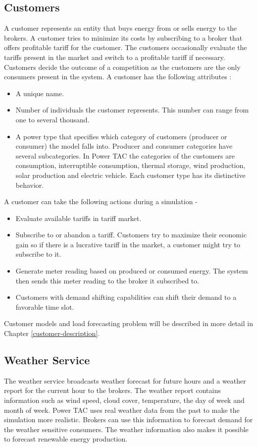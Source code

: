 \subsection{Customers}
A customer represents an entity that buys energy from or sells energy to the brokers. A customer tries to minimize its costs by subscribing to a broker that offers profitable tariff for the customer. The customers occasionally evaluate the tariffs present in the market and switch to a profitable tariff if necessary. Customers decide the outcome of a competition as the customers are the only consumers present in the system. A customer has the following attributes :
\begin{itemize}  
\item A unique name. 
\item Number of individuals the customer represents. This number can range from one to several thousand. 
\item A power type that specifies which category of customers (producer or consumer) the model falls into. Producer and consumer categories have several subcategories. In Power TAC the categories of the customers are consumption, interruptible consumption, thermal storage, wind production, solar production and electric vehicle. Each customer type has its distinctive behavior. 
\end{itemize}

A customer can take the following actions during a simulation - 
\begin{itemize}  
\item Evaluate available tariffs in tariff market.
\item Subscribe to or abandon a tariff. Customers try to maximize their economic gain so if there is a lucrative tariff in the market, a customer might try to subscribe to it.
\item Generate meter reading based on produced or consumed energy. The system then sends this meter reading to the broker it subscribed to. 
\item Customers with demand shifting capabilities can shift their demand to a favorable time slot.
\end{itemize}
 
Customer models and load forecasting problem will be described in more detail in Chapter \ref{customer-description}.

\subsection{Weather Service}
The weather service broadcasts weather forecast for future hours and a weather report for the current hour to the brokers. The weather report contains information such as wind speed, cloud cover, temperature, the day of week and month of week. Power TAC uses real weather data from the past to make the simulation more realistic. Brokers can use this information to forecast demand for the weather sensitive consumers. The weather information also makes it possible to forecast renewable energy production.



